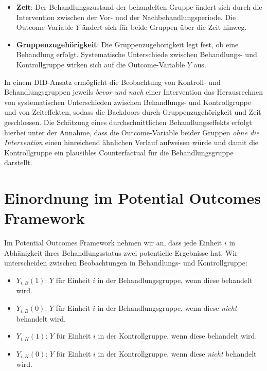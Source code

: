 \documentclass[
  a4paper,
  DIV=11,
  oneside]{scrreprt}
\providecommand{\tightlist}{%
  \setlength{\itemsep}{0pt}\setlength{\parskip}{0pt}}\usepackage{longtable,booktabs,array}
\begin{document}
\begin{itemize}
\item
  \textbf{Zeit}: Der Behandlungszustand der behandelten Gruppe ändert
  sich durch die Intervention zwischen der Vor- und der
  Nachbehandlungsperiode. Die Outcome-Variable \(Y\) ändert sich für
  beide Gruppen über die Zeit hinweg.
\item
  \textbf{Gruppenzugehörigkeit}: Die Gruppenzugehörigkeit legt fest, ob
  eine Behandlung erfolgt. Systematische Unterschiede zwischen
  Behandlungs- und Kontrollgruppe wirken sich auf die Outcome-Variable
  \(Y\) aus.
\end{itemize}

In einem DID-Ansatz ermöglicht die Beobachtung von Kontroll- und
Behandlungsgruppen jeweils \emph{bevor und nach} einer Intervention das
Herausrechnen von systematischen Unterschieden zwischen Behandlungs- und
Kontrollgruppe und von Zeiteffekten, sodass die Backdoors durch
Gruppenzugehörigkeit und Zeit geschlossen. Die Schätzung eines
durchschnittlichen Behandlungseffekts erfolgt hierbei unter der Annahme,
dass die Outcome-Variable beider Gruppen \emph{ohne die Intervention}
einen hinreichend ähnlichen Verlauf aufweisen würde und damit die
Kontrollgruppe ein plausibles Counterfactual für die Behandlungsgruppe
darstellt.

\section{Einordnung im Potential Outcomes
Framework}\label{einordnung-im-potential-outcomes-framework}

Im Potential Outcomes Framework nehmen wir an, dass jede Einheit \(i\)
in Abhänigkeit ihres Behandlungsstatus zwei potentielle Ergebnisse hat.
Wir unterscheiden zwischen Beobachtungen in Behandlungs- und
Kontrollgruppe:

\begin{itemize}
\tightlist
\item
  \(Y_{i,B}(1)\): \(Y\) für Einheit \(i\) in der Behandlungsgruppe, wenn
  diese behandelt wird.
\item
  \(Y_{i,B}(0)\): \(Y\) für Einheit \(i\) in der Behandlungsgruppe, wenn
  diese \emph{nicht} behandelt wird.
\item
  \(Y_{i,K}(1)\): \(Y\) für Einheit \(i\) in der Kontrollgruppe, wenn
  diese behandelt wird.
\item
  \(Y_{i,K}(0)\): \(Y\) für Einheit \(i\) in der Kontrollgruppe, wenn
  diese \emph{nicht} behandelt wird.
\end{itemize}
\end{document}
